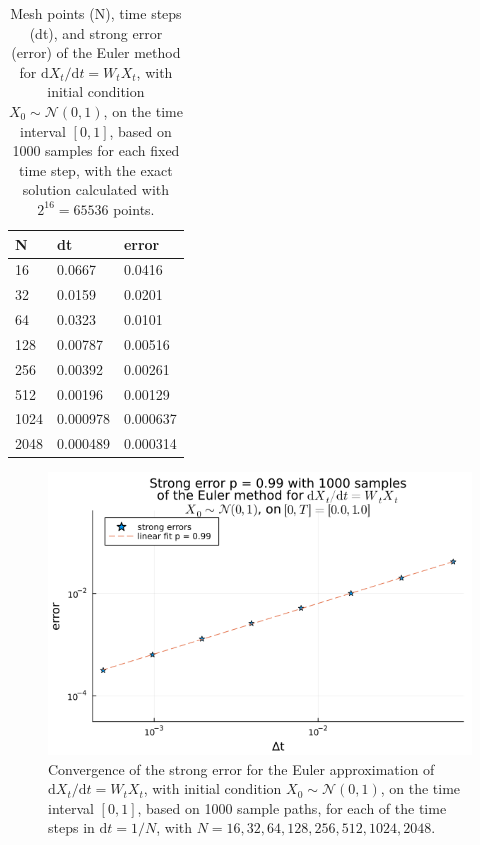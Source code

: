 \documentclass[reqno,12pt]{amsart}
\theoremstyle{plain}%
\theoremstyle{definition}
\begin{document}
\begin{table}
    \label{tablinearhomogeneousrode}
    \begin{tabular}[htb]{|l|l|l|}
        \hline N & dt & error \\
        \hline \hline 16 & 0.0667 & 0.0416 \\
        32 & 0.0159 & 0.0201 \\
        64 & 0.0323 & 0.0101 \\
        128 & 0.00787 & 0.00516 \\
        256 & 0.00392 & 0.00261 \\
        512 & 0.00196 & 0.00129 \\
        1024 & 0.000978 & 0.000637 \\
        2048 & 0.000489 & 0.000314 \\
        \hline
    \end{tabular}
    \caption{Mesh points (N), time steps (dt), and strong error (error) of the Euler method for $\mathrm{d}X_t/\mathrm{d}t = W_t X_t$, with initial condition $X_0 \sim \mathcal{N}(0, 1)$, on the time interval $[0, 1]$, based on 1000 samples for each fixed time step, with the exact solution calculated with $2^{16}=65536$ points.}
\end{table}

\begin{figure}[htb]
    \label{figlinearhomogeneousrode}
    \includegraphics[scale=0.75]{img/order_linearhomogenous.png}
    \caption{Convergence of the strong error for the Euler approximation of $\mathrm{d}X_t/\mathrm{d}t = W_t X_t$, with initial condition $X_0 \sim \mathcal{N}(0, 1)$, on the time interval $[0, 1]$, based on 1000 sample paths, for each of the time steps in $\mathrm{d}t = 1/N$, with $N = 16, 32, 64, 128, 256, 512, 1024, 2048$.}
\end{figure}
\end{document}
